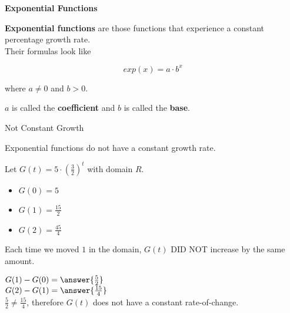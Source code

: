 \documentclass{ximera}
\begin{document}
\begin{definition} \textbf{\textcolor{green!50!black}{Exponential Functions}}


\textbf{Exponential functions} are those functions that experience a constant percentage growth rate. \\


Their formulas look like

\[
exp(x) = a \cdot b^x
\]


where $a \ne 0$ and $b > 0$.

$a$ is called the \textbf{coefficient} and $b$ is called the \textbf{base}.

\end{definition}

















\begin{fact}  Not Constant Growth



Exponential functions do not have a constant growth rate. \\

\begin{explanation}

Let $G(t) = 5 \cdot \left(\frac{3}{2}\right)^t$ with domain \textbf{$R$}. 






\begin{itemize}
\item $G(0) = 5$
\item $G(1) = \frac{15}{2}$
\item $G(2) = \frac{45}{4}$
\end{itemize}



Each time we moved $1$ in the domain, $G(t)$ DID NOT increase by the same amount.

$G(1) - G(0) = \answer{\frac{5}{2}}$ \\

$G(2) - G(1) = \answer{\frac{15}{4}}$ \\

$ \frac{5}{2}  \ne  \frac{15}{4} $, therefore $G(t)$ does not have a constant rate-of-change. \\


\end{explanation}

\end{fact}
\end{document}
